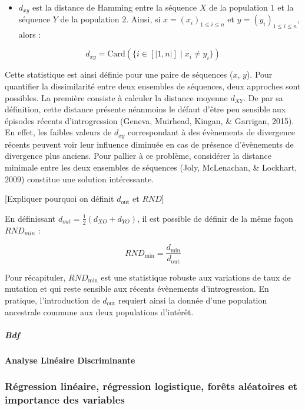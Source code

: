 \documentclass[12pt,a4paper,twoside]{ugathesis}
\providecommand{\tightlist}{%
  \setlength{\itemsep}{0pt}\setlength{\parskip}{0pt}}
\theoremstyle{definition}
\theoremstyle{definition}
\theoremstyle{remark}
\begin{document}
~
\begin{itemize}
\tightlist
\item
  \(d_{xy}\) est la distance de Hamming entre la séquence \(X\) de la
  population \(1\) et la séquence \(Y\) de la population \(2\). Ainsi,
  si \(x = (x_i)_{1 \leq i \leq n}\) et \(y = (y_i)_{1 \leq i \leq n}\),
  alors :
\end{itemize}
\[d_{xy} = \text{Card}(\{i \in [|1, n|] \; | \; x_i \neq y_i \})\]

Cette statistique est ainsi définie pour une paire de séquences (\(x\),
\(y\)). Pour quantifier la dissimilarité entre deux ensembles de
séquences, deux approches sont possibles. La première consiste à
calculer la distance moyenne \(d_{XY}\). De par sa définition, cette
distance présente néanmoins le défaut d'être peu sensible aux épisodes
récents d'introgression (Geneva, Muirhead, Kingan, \& Garrigan, 2015).
En effet, les faibles valeurs de \(d_{xy}\) correspondant à des
évènements de divergence récents peuvent voir leur influence diminuée en
cas de présence d'évènements de divergence plus anciens. Pour pallier à
ce problème, considérer la distance minimale entre les deux ensembles de
séquences (Joly, McLenachan, \& Lockhart, 2009) constitue une solution
intéressante.

{[}Expliquer pourquoi on définit \(d_{\text{out}}\) et \(RND\){]}

En définissant \(d_{out} = \frac{1}{2}(d_{XO} + d_{YO})\), il est
possible de définir de la même façon \(RND_{min}\) :

\[RND_{\text{min}} = \frac{d_{\text{min}}}{d_{\text{out}}}\]

Pour récapituler, \(RND_{\text{min}}\) est une statistique robuste aux
variations de taux de mutation et qui reste sensible aux récents
évènements d'introgression. En pratique, l'introduction de
\(d_{\text{out}}\) requiert ainsi la donnée d'une population ancestrale
commune aux deux populations d'intérêt.

\subparagraph{Bdf}\label{bdf}

\paragraph{Analyse Linéaire
Discriminante}\label{analyse-lineaire-discriminante}

\subsubsection{Régression linéaire, régression logistique, forêts
aléatoires et importance des
variables}\label{regression-lineaire-regression-logistique-forets-aleatoires-et-importance-des-variables}
\end{document}
